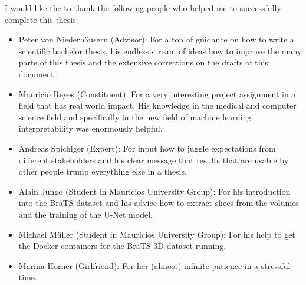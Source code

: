 I would like the to thank the following people who helped me to successfully complete this thesis:

\begin{itemize}
    \item Peter von Niederhäusern (Advisor): For a ton of guidance on how to write a scientific bachelor thesis, his endless stream of ideas how to improve the many parts of this thesis and the extensive corrections on the drafts of this document.
    \item Mauricio Reyes (Constituent): For a very interesting project assignment in a field that has real world impact. His knowledge in the medical and computer science field and specifically in the new field of machine learning interpretability was enormously helpful.
    \item Andreas Spichiger (Expert): For input how to juggle expectations from different stakeholders and his clear message that results that are usable by other people trump everything else in a thesis.
    \item Alain Jungo (Student in Mauricios University Group): For his introduction into the BraTS dataset and his advice how to extract slices from the volumes and the training of the U-Net model.
    \item Michael Müller (Student in Mauricios University Group): For his help to get the Docker containers for the BraTS 3D dataset running.
    \item Marina Horner (Girlfriend): For her (almost) infinite patience in a stressful time.
\end{itemize}
